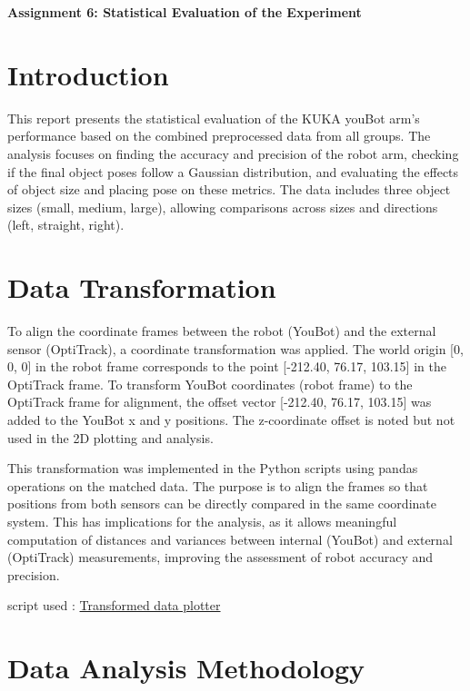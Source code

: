
\clearpage
\textbf{Assignment 6: Statistical Evaluation of the Experiment}
\setcounter{section}{0}

\section{Introduction}

This report presents the statistical evaluation of the KUKA youBot arm's performance based on the combined preprocessed data from all groups. The analysis focuses on finding the accuracy and precision of the robot arm, checking if the final object poses follow a Gaussian distribution, and evaluating the effects of object size and placing pose on these metrics. The data includes three object sizes (small, medium, large), allowing comparisons across sizes and directions (left, straight, right).

\section{Data Transformation}

To align the coordinate frames between the robot (YouBot) and the external sensor (OptiTrack), a coordinate transformation was applied. The world origin [0, 0, 0] in the robot frame corresponds to the point [-212.40, 76.17, 103.15] in the OptiTrack frame. To transform YouBot coordinates (robot frame) to the OptiTrack frame for alignment, the offset vector [-212.40, 76.17, 103.15] was added to the YouBot x and y positions. The z-coordinate offset is noted but not used in the 2D plotting and analysis.

This transformation was implemented in the Python scripts using pandas operations on the matched data. The purpose is to align the frames so that positions from both sensors can be directly compared in the same coordinate system. This has implications for the analysis, as it allows meaningful computation of distances and variances between internal (YouBot) and external (OptiTrack) measurements, improving the assessment of robot accuracy and precision.

script used : \href{https://github.com/Nikhil-URG/KUKA-Youbot-RobotArm_Manipulation/blob/Exp6_results/transformed_data_plotter.py}{Transformed data plotter}

\section{Data Analysis Methodology}

